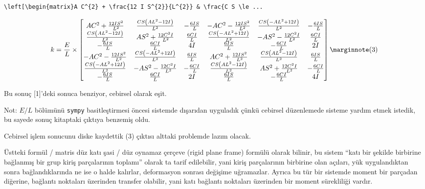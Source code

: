 \documentclass[12pt,fleqn]{article}\usepackage{../../common}
\begin{document}
\begin{verbatim}
\left[\begin{matrix}A C^{2} + \frac{12 I S^{2}}{L^{2}} & \frac{C S \le ...
\end{verbatim}

$$
k = 
\frac{E}{L} \times 
\left[\begin{matrix}A C^{2} + \frac{12 I S^{2}}{L^{2}} & \frac{C S \left(A L^{2} - 12 I\right)}{L^{2}} & - \frac{6 I S}{L} & - A C^{2} - \frac{12 I S^{2}}{L^{2}} & \frac{C S \left(- A L^{2} + 12 I\right)}{L^{2}} & - \frac{6 I S}{L}\\\frac{C S \left(A L^{2} - 12 I\right)}{L^{2}} & A S^{2} + \frac{12 C^{2} I}{L^{2}} & \frac{6 C I}{L} & \frac{C S \left(- A L^{2} + 12 I\right)}{L^{2}} & - A S^{2} - \frac{12 C^{2} I}{L^{2}} & \frac{6 C I}{L}\\- \frac{6 I S}{L} & \frac{6 C I}{L} & 4 I & \frac{6 I S}{L} & - \frac{6 C I}{L} & 2 I\\- A C^{2} - \frac{12 I S^{2}}{L^{2}} & \frac{C S \left(- A L^{2} + 12 I\right)}{L^{2}} & \frac{6 I S}{L} & A C^{2} + \frac{12 I S^{2}}{L^{2}} & \frac{C S \left(A L^{2} - 12 I\right)}{L^{2}} & \frac{6 I S}{L}\\\frac{C S \left(- A L^{2} + 12 I\right)}{L^{2}} & - A S^{2} - \frac{12 C^{2} I}{L^{2}} & - \frac{6 C I}{L} & \frac{C S \left(A L^{2} - 12 I\right)}{L^{2}} & A S^{2} + \frac{12 C^{2} I}{L^{2}} & - \frac{6 C I}{L}\\- \frac{6 I S}{L} & \frac{6 C I}{L} & 2 I & \frac{6 I S}{L} & - \frac{6 C I}{L} & 4 I\end{matrix}\right]
\mlabel{3}
$$

Bu sonuç [1]'deki sonuca benziyor, cebirsel olarak eşit.

Not: $E/L$ bölümünü \verb!sympy! basitleştirmesi öncesi sistemde dışarıdan
uyguladık çünkü cebirsel düzenlemede sisteme yardım etmek istedik, bu sayede
sonuç kitaptaki çıktıya benzemiş oldu.

Cebirsel işlem sonucunu diske kaydettik (3) çıktısı alttaki problemde
lazım olacak. 

Üstteki formül / matris düz katı şasi / düz oynamaz çerçeve (rigid plane frame)
formülü olarak bilinir, bu sistem ``katı bir şekilde birbirine bağlanmış bir
grup kiriş parçalarının toplamı'' olarak ta tarif edilebilir, yani kiriş
parçalarının birbirine olan açıları, yük uygulandıktan sonra bağlandıklarında ne
ise o halde kalırlar, deformasyon sonrası değişime uğramazlar. Ayrıca bu tür bir
sistemde moment bir parçadan diğerine, bağlantı noktaları üzerinden transfer
olabilir, yani katı bağlantı noktaları üzerinden bir moment sürekliliği vardır.
\end{document}
